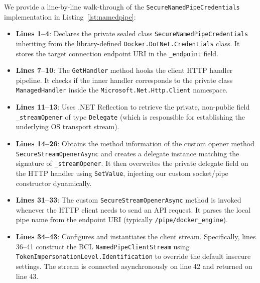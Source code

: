 We provide a line-by-line walk-through of the \texttt{SecureNamedPipeCredentials} implementation in Listing~\ref{lst:namedpipe}:
\begin{itemize}
    \item \textbf{Lines 1--4}: Declares the private sealed class \texttt{SecureNamedPipeCredentials} inheriting from the library-defined \texttt{Docker.DotNet.Credentials} class. It stores the target connection endpoint URI in the \texttt{\_endpoint} field.
    \item \textbf{Lines 7--10}: The \texttt{GetHandler} method hooks the client HTTP handler pipeline. It checks if the inner handler corresponds to the private class \texttt{ManagedHandler} inside the \texttt{Microsoft.Net.Http.Client} namespace.
    \item \textbf{Lines 11--13}: Uses .NET Reflection to retrieve the private, non-public field \texttt{\_stream\-Opener} of type \texttt{Delegate} (which is responsible for establishing the underlying OS transport stream).
    \item \textbf{Lines 14--26}: Obtains the method information of the custom opener method \texttt{Secure\-Stream\-Opener\-Async} and creates a delegate instance matching the signature of \texttt{\_stream\-Opener}. It then overwrites the private delegate field on the HTTP handler using \texttt{SetValue}, injecting our custom socket/pipe constructor dynamically.
    \item \textbf{Lines 31--33}: The custom \texttt{SecureStreamOpenerAsync} method is invoked whenever the HTTP client needs to send an API request. It parses the local pipe name from the endpoint URI (typically \texttt{/pipe/docker\_engine}).
    \item \textbf{Lines 34--43}: Configures and instantiates the client stream. Specifically, lines 36--41 construct the BCL \texttt{NamedPipe\-Client\-Stream} using \texttt{Token\-Impersonation\-Level.\allowbreak Identification} to override the default insecure settings. The stream is connected asynchronously on line 42 and returned on line 43.
\end{itemize}

